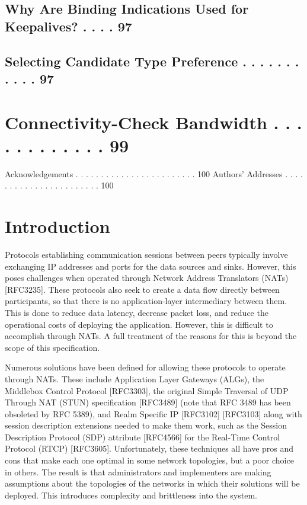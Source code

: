 \documentclass{article}
\begin{document}
\subsection{Why Are Binding Indications Used for Keepalives?  . . . .  97}

\subsection{Selecting Candidate Type Preference . . . . . . . . . . .  97}

\section{Connectivity-Check Bandwidth . . . . . . . . . . . .  99}

Acknowledgements  . . . . . . . . . . . . . . . . . . . . . . . . 100 Authors' Addresses  . . . . . . . . . . . . . . . . . . . . . . . 100

\section{Introduction}

Protocols establishing communication sessions between peers typically involve exchanging IP addresses and ports for the data sources and sinks.  However, this poses challenges when operated through Network Address Translators (NATs) [RFC3235].  These protocols also seek to create a data flow directly between participants, so that there is no application-layer intermediary between them.  This is done to reduce data latency, decrease packet loss, and reduce the operational costs of deploying the application.  However, this is difficult to accomplish through NATs.  A full treatment of the reasons for this is beyond the scope of this specification.

Numerous solutions have been defined for allowing these protocols to operate through NATs.  These include Application Layer Gateways (ALGs), the Middlebox Control Protocol [RFC3303], the original Simple Traversal of UDP Through NAT (STUN) specification [RFC3489] (note that RFC 3489 has been obsoleted by RFC 5389), and Realm Specific IP [RFC3102] [RFC3103] along with session description extensions needed to make them work, such as the Session Description Protocol (SDP) attribute [RFC4566] for the Real-Time Control Protocol (RTCP) [RFC3605].  Unfortunately, these techniques all have pros and cons that make each one optimal in some network topologies, but a poor choice in others.  The result is that administrators and implementers are making assumptions about the topologies of the networks in which their solutions will be deployed.  This introduces complexity and brittleness into the system.
\end{document}

